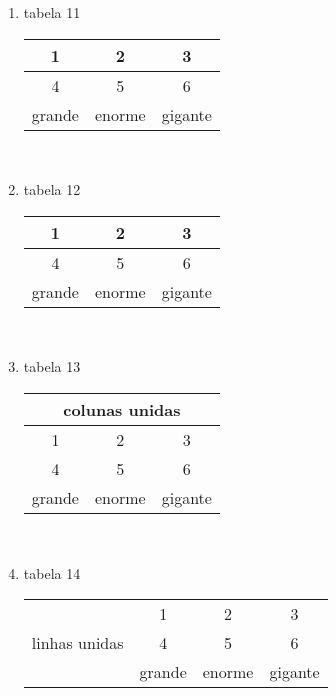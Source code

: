\documentclass[10pt,a4paper]{report}
\begin{document}
\begin{enumerate}
\item tabela 11\\
\begin{center}
\begin{tabular}{|c|c|c|}
\hline
1 & 2 & 3 \\ 
\hline
4 & 5 & 6 \\ 
\hline
grande & enorme & gigante \\ 
\hline
\end{tabular}\\
\end{center}


\item tabela 12\\
\begin{center}
\begin{tabular}{|c|c|c|}
\hline
1 & 2 & 3 \\ 
\hline
4 & 5 & 6 \\ 
\hline
grande & enorme & gigante \\ 
\hline
\end{tabular}\\
\end{center}

\item tabela 13\\
\begin{center}
\begin{tabular}{|c|c|c|}
\hline
\multicolumn{3}{|c|}{colunas unidas} \\
\hline
1 & 2 & 3 \\ 
\hline
4 & 5 & 6 \\ 
\hline
grande & enorme & gigante \\ 
\hline
\end{tabular}\\
\end{center}

\item tabela 14\\
\begin{center}
\begin{tabular}{|c|c|c|c|}
\hline
\multirow{3}{*}{linhas unidas} & 1 & 2 & 3\\
							   & 4 & 5 & 6 \\  
							   & grande & enorme & gigante \\ 
\hline
\end{tabular}\\
\end{center}



\end{enumerate}
\end{document}
